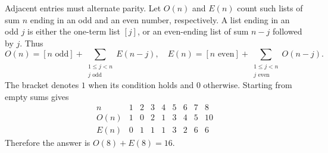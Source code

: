 Adjacent entries must alternate parity. Let $O(n)$ and $E(n)$ count such lists of sum $n$ ending in an odd and an even number, respectively. A list ending in an odd $j$ is either the one-term list $[j]$, or an even-ending list of sum $n-j$ followed by $j$. Thus
\[
O(n)=[n\text{ odd}]+\sum_{\substack{1\le j<n\\j\text{ odd}}}E(n-j),
\quad
E(n)=[n\text{ even}]+\sum_{\substack{1\le j<n\\j\text{ even}}}O(n-j).
\]
The bracket denotes $1$ when its condition holds and $0$ otherwise. Starting from empty sums gives
\[
\begin{array}{c|rrrrrrrr}
n&1&2&3&4&5&6&7&8\\\hline
O(n)&1&0&2&1&3&4&5&10\\
E(n)&0&1&1&1&3&2&6&6
\end{array}
\]
Therefore the answer is $\boxed{O(8)+E(8)=16}$.
